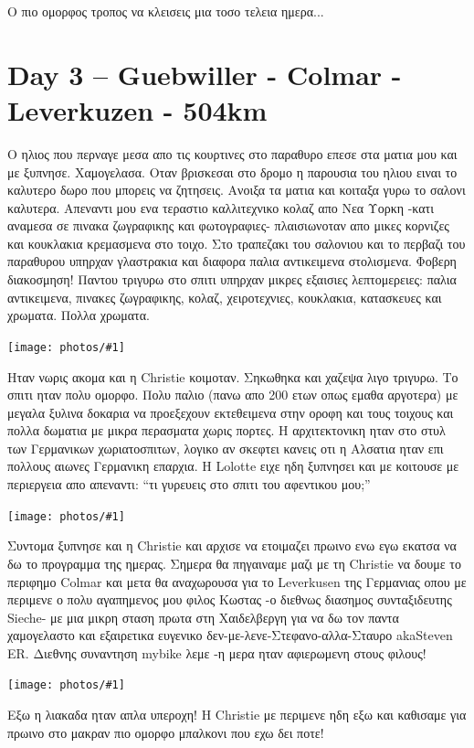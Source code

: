 \documentclass[11pt, letterpaper]{book}
\newcommand\photo[1]{\begin{center}\noindent\texttt{[image: photos/\#1]}\end{center}}
\begin{document}
Ο πιο ομορφος τροπος να κλεισεις μια τοσο τελεια ημερα...

\chapter{Day 3 -- Guebwiller - Colmar - Leverkuzen - 504km}

Ο ηλιος που περναγε μεσα απο τις κουρτινες στο παραθυρο επεσε στα ματια μου και με ξυπνησε. Χαμογελασα. Οταν βρισκεσαι στο δρομο η παρουσια του ηλιου ειναι το καλυτερο δωρο που μπορεις να ζητησεις.
Ανοιξα τα ματια και κοιταξα γυρω το σαλονι καλυτερα. Απεναντι μου ενα τεραστιο καλλιτεχνικο κολαζ απο Νεα Υορκη -κατι αναμεσα σε πινακα ζωγραφικης και φωτογραφιες- πλαισιωνοταν απο μικες κορνιζες και κουκλακια κρεμασμενα στο τοιχο.
Στο τραπεζακι του σαλονιου και το περβαζι του παραθυρου υπηρχαν γλαστρακια και διαφορα παλια αντικειμενα στολισμενα. Φοβερη διακοσμηση! Παντου τριγυρω στο σπιτι υπηρχαν μικρες εξαισιες λεπτομερειες: παλια αντικειμενα, πινακες ζωγραφικης, κολαζ, χειροτεχνιες, κουκλακια, κατασκευες και χρωματα. Πολλα χρωματα.

\photo{80.jpg}

Ηταν νωρις ακομα και η Christie κοιμοταν. Σηκωθηκα και χαζεψα λιγο τριγυρω.
Το σπιτι ηταν πολυ ομορφο. Πολυ παλιο (πανω απο 200 ετων οπως εμαθα αργοτερα) με μεγαλα ξυλινα δοκαρια να προεξεχουν εκτεθειμενα στην οροφη και τους τοιχους και πολλα δωματια με μικρα περασματα χωρις πορτες. Η αρχιτεκτονικη ηταν στο στυλ των Γερμανικων χωριατοσπιτων, λογικο αν σκεφτει κανεις οτι η Αλσατια ηταν επι πολλους αιωνες Γερμανικη επαρχια.
Η Lolotte ειχε ηδη ξυπνησει και με κοιτουσε με περιεργεια απο απεναντι: ``τι γυρευεις στο σπιτι του αφεντικου μου;''

\photo{81.jpg}

Συντομα ξυπνησε και η Christie και αρχισε να ετοιμαζει πρωινο ενω εγω εκατσα να δω το προγραμμα της ημερας.
Σημερα θα πηγαιναμε μαζι με τη Christie να δουμε το περιφημο Colmar και μετα θα αναχωρουσα για το Leverkusen της Γερμανιας οπου με περιμενε ο πολυ αγαπημενος μου φιλος Κωστας -ο διεθνως διασημος συνταξιδευτης Sieche- με μια μικρη σταση πρωτα στη Χαιδελβεργη για να δω τον παντα χαμογελαστο και εξαιρετικα ευγενικο δεν-με-λενε-Στεφανο-αλλα-Σταυρο akaSteven ER.
Διεθνης συναντηση mybike λεμε -η μερα ηταν αφιερωμενη στους φιλους!

\photo{82.jpg}

Εξω η λιακαδα ηταν απλα υπεροχη! Η Christie με περιμενε ηδη εξω και καθισαμε για πρωινο στο μακραν πιο ομορφο μπαλκονι που εχω δει ποτε!
\end{document}
